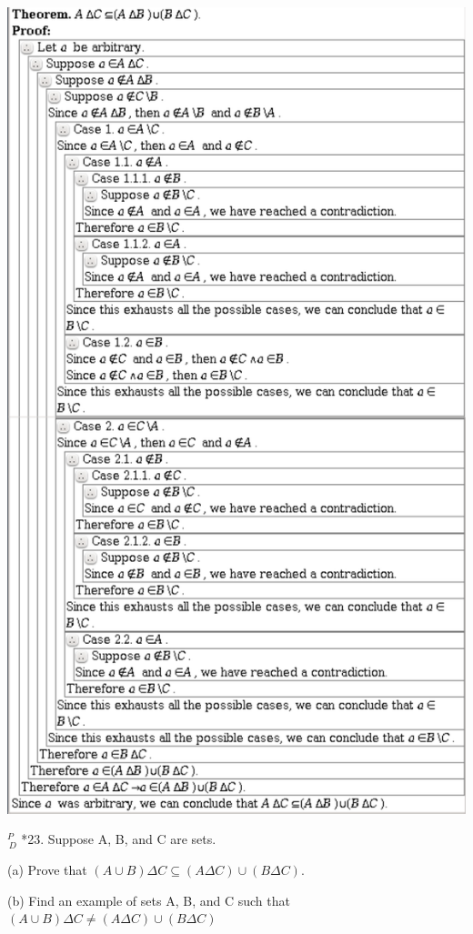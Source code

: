 \documentclass{article}
\begin{document}
\includegraphics[width=\textwidth]{3_5_22_2}

\vspace{30pt}

$^{\textit{P}}_{\, \textit{D}}$ *23. Suppose A, B, and C are sets.

\hspace{12pt}(a) Prove that $(A \cup B) \Delta C \subseteq (A \Delta C) \cup (B \Delta C)$.

\hspace{12pt}(b) Find an example of sets A, B, and C such that $(A \cup B) \Delta C \neq
(A \Delta C) \cup (B \Delta C)$
\end{document}
